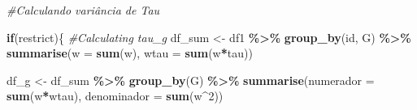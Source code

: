 \documentclass[portugues]{article}
\newenvironment{Shaded}{\begin{snugshade}}{\end{snugshade}}
\newcommand{\AttributeTok}[1]{\textcolor[rgb]{0.13,0.29,0.53}{#1}}
\newcommand{\CommentTok}[1]{\textcolor[rgb]{0.56,0.35,0.01}{\textit{#1}}}
\newcommand{\ControlFlowTok}[1]{\textcolor[rgb]{0.13,0.29,0.53}{\textbf{#1}}}
\newcommand{\DecValTok}[1]{\textcolor[rgb]{0.00,0.00,0.81}{#1}}
\newcommand{\FunctionTok}[1]{\textcolor[rgb]{0.13,0.29,0.53}{\textbf{#1}}}
\newcommand{\NormalTok}[1]{#1}
\newcommand{\OtherTok}[1]{\textcolor[rgb]{0.56,0.35,0.01}{#1}}
\newcommand{\SpecialCharTok}[1]{\textcolor[rgb]{0.81,0.36,0.00}{\textbf{#1}}}
\begin{document}
\begin{box_code}
\begin{Shaded}
    \end{Shaded}
      
    \begin{Shaded}
    \begin{Highlighting}[]
      
      \CommentTok{\#Calculando variância de Tau}
      
      \ControlFlowTok{if}\NormalTok{(restrict)\{}
        \CommentTok{\#Calculating tau\_g}
    \NormalTok{    df\_sum }\OtherTok{\textless{}{-}}\NormalTok{ df1 }\SpecialCharTok{\%\textgreater{}\%} \FunctionTok{group\_by}\NormalTok{(id, G) }\SpecialCharTok{\%\textgreater{}\%} 
                          \FunctionTok{summarise}\NormalTok{(}\AttributeTok{w =} \FunctionTok{sum}\NormalTok{(w),}
                                    \AttributeTok{wtau =} \FunctionTok{sum}\NormalTok{(w}\SpecialCharTok{*}\NormalTok{tau))}
        
    \NormalTok{    df\_g }\OtherTok{\textless{}{-}}\NormalTok{ df\_sum }\SpecialCharTok{\%\textgreater{}\%} \FunctionTok{group\_by}\NormalTok{(G) }\SpecialCharTok{\%\textgreater{}\%}
                           \FunctionTok{summarise}\NormalTok{(}\AttributeTok{numerador =} \FunctionTok{sum}\NormalTok{(w}\SpecialCharTok{*}\NormalTok{wtau),}
                                     \AttributeTok{denominador =} \FunctionTok{sum}\NormalTok{(w}\SpecialCharTok{\^{}}\DecValTok{2}\NormalTok{))}
        

\end{Highlighting}
\end{Shaded}
\end{box_code}
\end{document}
